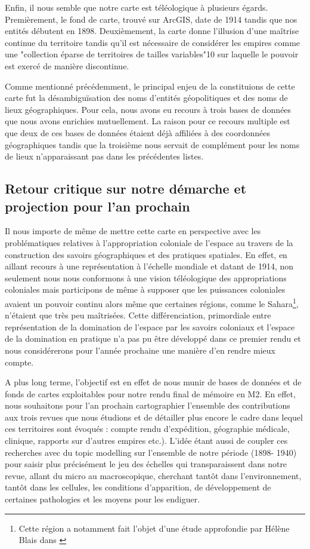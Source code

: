 Enfin, il nous semble que notre carte est téléologique à plusieurs égards. Premièrement, le fond de carte, trouvé sur ArcGIS, date de 1914 tandis que nos entités débutent en 1898. Deuxièmement, la carte donne l’illusion d’une maîtrise continue du territoire tandis qu’il est nécessaire de considérer les empires comme une "collection éparse de territoires de tailles variables"10 sur laquelle le pouvoir est exercé de manière discontinue.

Comme mentionné précédemment, le principal enjeu de la constituions de cette carte fut la désambiguïsation des noms d’entités géopolitiques et des noms de lieux géographiques.
Pour cela, nous avons eu recours à trois bases de données que nous avons enrichies mutuellement. La raison pour ce recours multiple est que deux de ces bases de données étaient déjà affiliées à des coordonnées géographiques tandis que la troisième nous servait de complément pour les noms de lieux n’apparaissant pas dans les précédentes listes.


\subsection{Retour critique sur notre démarche et projection pour l'an prochain}

Il nous importe de même de mettre cette carte en perspective avec les problématiques relatives à l’appropriation coloniale de l’espace au travers de la construction des savoirs géographiques et des pratiques spatiales. En effet, en aillant recours à une représentation à l’échelle mondiale et datant de 1914, non seulement nous nous conformons à une vision téléologique des appropriations coloniales mais participons de même à supposer que les puissances coloniales avaient un pouvoir continu alors même que certaines régions, comme le Sahara\footnote{Cette région a notamment fait l'objet d'une étude approfondie par Hélène Blais dans \cite{blais_territoires_2020}}, n’étaient que très peu maîtrisées. Cette différenciation, primordiale entre représentation de la domination de l'espace par les savoirs coloniaux et l'espace de la domination en pratique n’a pas pu être développé dans ce premier rendu et nous considérerons pour l’année prochaine une manière d’en rendre mieux compte.


A plus long terme, l’objectif est en effet de nous munir de bases de données et de fonds de cartes exploitables pour notre rendu final de mémoire en M2. En effet, nous souhaitons pour l’an prochain cartographier l’ensemble des contributions aux trois revues que nous étudions et de détailler plus encore le cadre dans lequel ces territoires sont évoqués : compte rendu d’expédition, géographie médicale, clinique, rapports sur d’autres empires etc.). L’idée étant aussi de coupler ces recherches avec du topic modelling sur l’ensemble de notre période (1898- 1940) pour saisir plus précisément le jeu des échelles qui transparaissent dans notre revue, allant du micro au macroscopique, cherchant tantôt dans l’environnement, tantôt dans les cellules, les conditions d’apparition, de développement de certaines pathologies et les moyens pour les endiguer.


